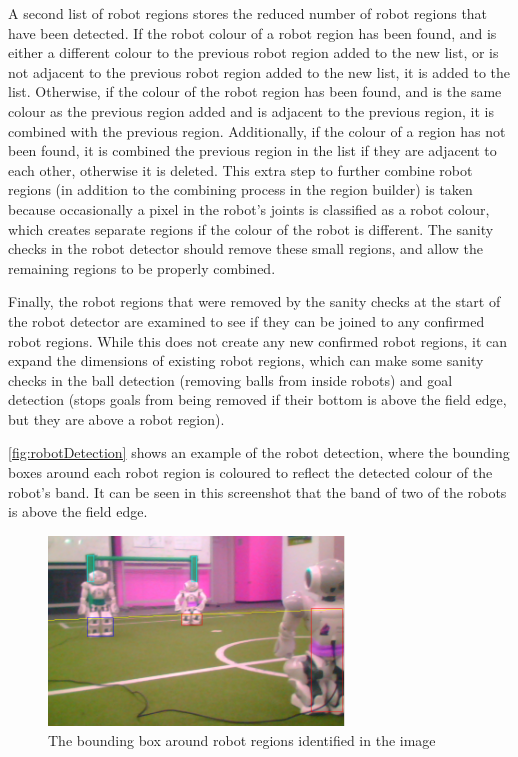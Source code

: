 \documentclass[pdftex,11pt,a4paper]{report}
\begin{document}
A second list of robot regions stores the reduced number of robot regions that have been detected. If the robot colour of a robot region has been found, and is either a different colour to the previous robot region added to the new list, or is not adjacent to the previous robot region added to the new list, it is added to the list. Otherwise, if the colour of the robot region has been found, and is the same colour as the previous region added and is adjacent to the previous region, it is combined with the previous region. Additionally, if the colour of a region has not been found, it is combined the previous region in the list if they are adjacent to each other, otherwise it is deleted. This extra step to further combine robot regions (in addition to the combining process in the region builder) is taken because occasionally a pixel in the robot's joints is classified as a robot colour, which creates separate regions if the colour of the robot is different. The sanity checks in the robot detector should remove these small regions, and allow the remaining regions to be properly combined.

Finally, the robot regions that were removed by the sanity checks at the start of the robot detector are examined to see if they can be joined to any confirmed robot regions. While this does not create any new confirmed robot regions, it can expand the dimensions of existing robot regions, which can make some sanity checks in the ball detection (removing balls from inside robots) and goal detection (stops goals from being removed if their bottom is above the field edge, but they are above a robot region).

\autoref{fig:robotDetection} shows an example of the robot detection, where the bounding boxes around each robot region is coloured to reflect the detected colour of the robot's band. It can be seen in this screenshot that the band of two of the robots is above the field edge.

\begin{figure} [t]
\centering
\includegraphics[width=0.7\textwidth]{figures/robotDetectionScreenshot.png}
\caption{The bounding box around robot regions identified in the image} \label{fig:robotDetection}
\end{figure}
\end{document}
